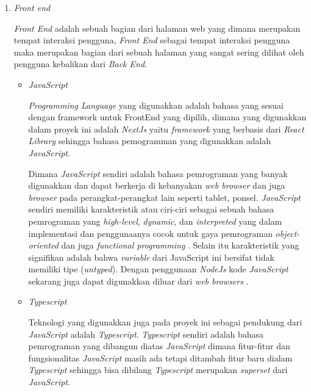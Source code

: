 \documentclass[a4paper]{article}
\begin{document}
\begin{enumerate}[label=\alph*. ]
\begin{enumerate}
              \item \textit{Front end}

                    \textit{Front End} adalah sebuah bagian dari halaman web yang dimana merupakan tempat interaksi pengguna, \textit{Front End} sebagai tempat interaksi pengguna maka merupakan bagian dari sebuah halaman yang sangat sering dilihat oleh pengguna kebalikan dari \textit{Back End}\autocite{codecademy-frontend}.

                    \begin{itemize}
                        \item \textit{JavaScript}

                        \textit{Programming Language} yang digunakkan adalah bahasa yang sesuai dengan framework untuk FrontEnd yang dipilih, dimana yang digunakkan dalam proyek ini adalah \textit{NextJs} yaitu \textit{framework} yang berbasis dari \textit{React Library} sehingga bahasa pemogramman yang digunakkan adalah \textit{JavaScript}.

                        Dimana \textit{JavaScript} sendiri adalah bahasa pemrograman yang banyak digunakkan dan dapat berkerja di kebanyakan \textit{web browser} dan juga \textit{browser} pada perangkat-perangkat lain seperti tablet, ponsel. \textit{JavaScript} sendiri memiliki karakteristik atau ciri-ciri sebagai sebuah bahasa pemrograman yang \textit{high-level}, \textit{dynamic}, dan \textit{interpreted} yang dalam implementasi dan penggunaanya cocok untuk gaya pemrograman \textit{object-oriented} dan juga \textit{functional programming} . Selain itu karakteristik yang signifikan adalah bahwa \textit{variable} dari JavaScript ini bersifat tidak memiliki tipe (\textit{untyped}). Dengan penggunaan \textit{NodeJs} kode \textit{JavaScript} sekarang juga dapat digunakkan diluar dari \textit{web browsers} \autocite{Js_book_Flanagan_2020}.

                        \item \textit{Typescript}

                        Teknologi yang digunakkan juga pada proyek ini sebagai pendukung dari \textit{JavaScript} adalah \textit{Typescript}. \textit{Typescript} sendiri adalah bahasa pemrograman yang dibangun diatas \textit{JavaScript} dimana fitur-fitur dan fungsionalitas \textit{JavaScript} masih ada tetapi ditambah fitur baru dialam \textit{Typescript} sehingga bisa dibilang \textit{Typescript} merupakan \textit{superset} dari \textit{JavaScript}.


\end{itemize}
\end{enumerate}
\end{enumerate}
\end{document}
